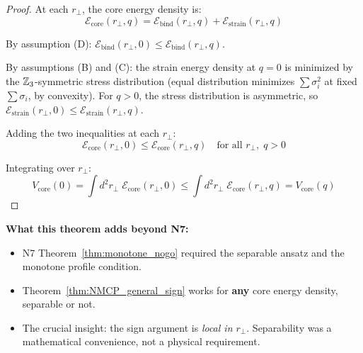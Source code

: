 \begin{proof}
At each $r_\perp$, the core energy density is:
\begin{equation}
    \mathcal{E}_{\mathrm{core}}(r_\perp, q)
    = \mathcal{E}_{\mathrm{bind}}(r_\perp, q)
    + \mathcal{E}_{\mathrm{strain}}(r_\perp, q)
\end{equation}

By assumption (D):
$\mathcal{E}_{\mathrm{bind}}(r_\perp, 0) \leq
\mathcal{E}_{\mathrm{bind}}(r_\perp, q)$.

By assumptions (B) and (C): the strain energy density at $q = 0$ is
minimized by the $\mathbb{Z}_3$-symmetric stress distribution
(equal distribution minimizes $\sum \sigma_i^2$ at fixed
$\sum \sigma_i$, by convexity). For $q > 0$, the stress distribution
is asymmetric, so
$\mathcal{E}_{\mathrm{strain}}(r_\perp, 0) \leq
\mathcal{E}_{\mathrm{strain}}(r_\perp, q)$.

Adding the two inequalities at each $r_\perp$:
\begin{equation}
    \mathcal{E}_{\mathrm{core}}(r_\perp, 0)
    \leq \mathcal{E}_{\mathrm{core}}(r_\perp, q)
    \quad \text{for all } r_\perp,\; q > 0
\end{equation}

Integrating over $r_\perp$:
\begin{equation}
    V_{\mathrm{core}}(0) = \int d^2 r_\perp\;
    \mathcal{E}_{\mathrm{core}}(r_\perp, 0)
    \leq \int d^2 r_\perp\;
    \mathcal{E}_{\mathrm{core}}(r_\perp, q)
    = V_{\mathrm{core}}(q)
\end{equation}
\end{proof}

\textbf{What this theorem adds beyond N7:}
\begin{itemize}
    \item N7 Theorem~\ref{thm:monotone_nogo} required the separable
          ansatz and the monotone profile condition.
    \item Theorem~\ref{thm:NMCP_general_sign} works for
          \textbf{any} core energy density, separable or not.
    \item The crucial insight: the sign argument is \emph{local in
          $r_\perp$}. Separability was a mathematical convenience,
          not a physical requirement.
\end{itemize}

